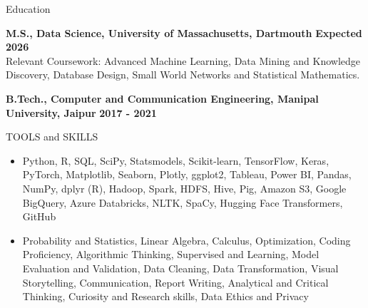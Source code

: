 \documentclass{resume} %
\begin{document}

\begin{rSection}{Education}

{\bf M.S., Data Science, University of Massachusetts, Dartmouth} \hfill \textbf{Expected 2026}\\
Relevant Coursework: Advanced Machine Learning, Data Mining and Knowledge Discovery, Database Design, Small World Networks and Statistical Mathematics.

{\bf B.Tech., Computer and Communication Engineering, Manipal University, Jaipur} \hfill \textbf{2017 - 2021}

\end{rSection}

\begin{rSection}{TOOLS and SKILLS}
\begin{itemize}
    \itemsep -3pt{}
    \item Python, R, SQL, SciPy, Statsmodels, Scikit-learn, TensorFlow, Keras, PyTorch, Matplotlib, Seaborn, Plotly, ggplot2, Tableau, Power BI, Pandas, NumPy, dplyr (R), Hadoop, Spark, HDFS, Hive, Pig, Amazon S3, Google BigQuery, Azure Databricks, NLTK, SpaCy, Hugging Face Transformers, GitHub
    \item Probability and Statistics, Linear Algebra, Calculus, Optimization, Coding Proficiency, Algorithmic Thinking, Supervised and Learning, Model Evaluation and Validation, Data Cleaning, Data Transformation, Visual Storytelling, Communication, Report Writing, Analytical and Critical Thinking, Curiosity and Research skills, Data Ethics and Privacy 
\end{itemize}
\end{rSection}
\end{document}
